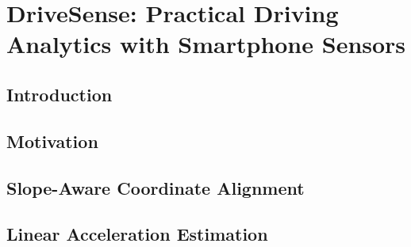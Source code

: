 
\chapter{DriveSense: Practical Driving Analytics with Smartphone Sensors} 

\section{Introduction}



\section{Motivation}




\section{Slope-Aware Coordinate Alignment}
\label{section_alignment}


\section{Linear Acceleration Estimation}







